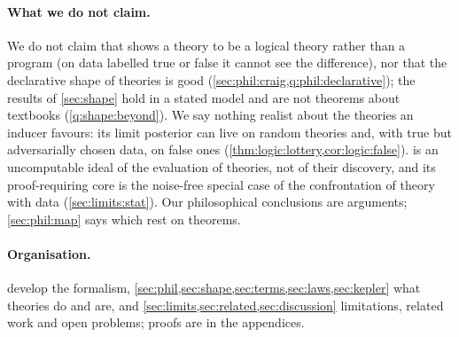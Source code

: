 \paragraph{What we do not claim.}\label{sec:intro:notclaim} We do not claim that \SAIabbr shows a theory to be a logical theory rather than a program (on data labelled true or false it cannot see the difference), nor that the declarative shape of theories is good (\cref{sec:phil:craig,q:phil:declarative}); the results of \cref{sec:shape} hold in a stated model and are not theorems about textbooks (\cref{q:shape:beyond}). We say nothing realist about the theories an inducer favours: its limit posterior can live on random theories and, with true but adversarially chosen data, on false ones (\cref{thm:logic:lottery,cor:logic:false}). \SAIabbr is an uncomputable ideal of the evaluation of theories, not of their discovery, and its proof-requiring core is the noise-free special case of the confrontation of theory with data (\cref{sec:limits:stat}). Our philosophical conclusions are arguments; \cref{sec:phil:map} says which rest on theorems.

\paragraph{Organisation.}  develop the formalism, \cref{sec:phil,sec:shape,sec:terms,sec:laws,sec:kepler} what theories do and are, and \cref{sec:limits,sec:related,sec:discussion} limitations, related work and open problems; proofs are in the appendices.
